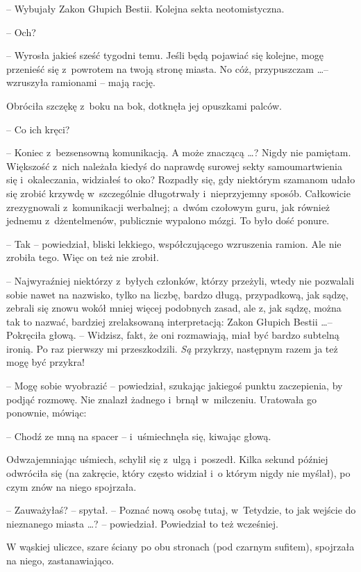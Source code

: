 \documentclass[oneside,polish,11pt,rmheadings]{mwbk}
\begin{document}
-- Wybujały Zakon Głupich Bestii. Kolejna sekta neotomistyczna. 

-- Och?  

-- Wyrosła jakieś sześć tygodni temu. Jeśli będą pojawiać się kolejne, mogę przenieść się z~powrotem na twoją stronę miasta. No cóż, przypuszczam \ldots  -- wzruszyła ramionami -- mają rację. 

Obróciła szczękę z~boku na bok, dotknęła jej opuszkami palców. 

-- Co ich kręci? 

-- Koniec z~bezsensowną komunikacją. A może znaczącą \ldots ? Nigdy nie pamiętam. Większość z~nich należała kiedyś do naprawdę surowej sekty samoumartwienia się i~okaleczania, widziałeś to oko? Rozpadły się, gdy niektórym szamanom udało się zrobić krzywdę  w~szczególnie długotrwały i~nieprzyjemny sposób. Całkowicie zrezygnowali z~komunikacji werbalnej; a~dwóm czołowym guru, jak również jednemu z~dżentelmenów, publicznie wypalono mózgi. To było dość ponure. 

-- Tak -- powiedział, bliski lekkiego, współczującego wzruszenia ramion. Ale nie zrobiła tego. Więc on też nie zrobił. 

-- Najwyraźniej niektórzy z~byłych członków, którzy przeżyli, wtedy nie pozwalali sobie nawet na nazwisko, tylko na liczbę, bardzo długą, przypadkową, jak sądzę, zebrali się znowu wokół mniej więcej podobnych zasad, ale z, jak sądzę, można tak to nazwać, bardziej zrelaksowaną interpretacją: Zakon Głupich Bestii \ldots  -- Pokręciła głową. -- Widzisz, fakt, że oni rozmawiają, miał być bardzo subtelną ironią. Po raz pierwszy mi przeszkodzili. \textit{Są }przykrzy, następnym razem ja też mogę być przykra!  

-- Mogę sobie wyobrazić -- powiedział, szukając jakiegoś punktu zaczepienia, by podjąć rozmowę. Nie znalazł żadnego i~brnął w~milczeniu. Uratowała go ponownie, mówiąc:  

-- Chodź ze mną na spacer -- i~uśmiechnęła się, kiwając głową. 

Odwzajemniając uśmiech, schylił się z~ulgą i~poszedł. Kilka sekund później odwróciła się (na zakręcie, który często widział i~o którym nigdy nie myślał), po czym znów na niego spojrzała. 

-- Zauważyłaś? -- spytał. --  Poznać nową osobę tutaj, w~Tetydzie, to jak wejście do nieznanego miasta \ldots ? -- powiedział. Powiedział to też wcześniej. 

W wąskiej uliczce, szare ściany po obu stronach (pod czarnym sufitem), spojrzała na niego, zastanawiająco. 
\end{document}

